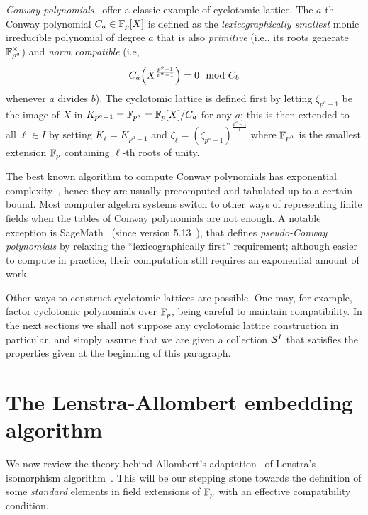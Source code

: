 \documentclass{sig-alternate}
\begin{document}
\emph{Conway polynomials}~\cite{Nickel1988} offer a classic example of
cyclotomic lattice. %
The $a$-th Conway polynomial $C_a\in\mathbb{F}_p[X]$ is defined as the
\emph{lexicographically smallest} monic irreducible polynomial of
degree $a$ that is also \emph{primitive} (i.e., its roots generate
$\mathbb{F}_{p^a}^\times$) and \emph{norm compatible} (i.e,
$$C_a\Bigl(X^{\frac{p^b-1}{p^a-1}}\Bigr) = 0 \mod C_b$$
whenever $a$ divides $b$). %
The cyclotomic lattice is defined first by letting $\zeta_{p^a-1}$ be the
image of $X$ in $K_{p^a-1}=\mathbb{F}_{p^a}=\mathbb{F}_p[X]/C_a$ for any $a$;
this is then extended to all $\ell\in I$ by setting $K_\ell=K_{p^a-1}$
and $\zeta_\ell=(\zeta_{p^a-1})^{\frac{p^a-1}{\ell}}$
where $\mathbb{F}_{p^a}$ is the smallest extension $\mathbb{F}_p$ containing $\ell$-th roots of unity.

The best known algorithm to compute Conway polynomials has exponential
complexity~\cite{heath+loehr99}, hence they are usually precomputed
and tabulated up to a certain bound. %
Most computer algebra systems switch to other ways of representing
finite fields when the tables of Conway polynomials are not enough. %
A notable exception is SageMath~\cite{Sage} (since version
5.13~\cite{Roe2013}), that defines \emph{pseudo-Conway polynomials} by
relaxing the ``lexicographically first'' requirement; although
easier to compute in practice, their computation still requires an
exponential amount of work.

Other ways to construct cyclotomic lattices are possible. %
One may, for example, factor cyclotomic polynomials over $\mathbb{F}_p$, being
careful to maintain compatibility. %
In the next sections we shall not suppose any cyclotomic lattice
construction in particular, and simply assume that we are given a
collection $\mathcal{S}^{I}$ that satisfies the properties given at the
beginning of this paragraph.

\section{The Lenstra-Allombert embedding algorithm}
\label{sec:lenstra}

We now review the theory behind Allombert's
adaptation~\cite{Allombert02} of Lenstra's isomorphism
algorithm~\cite{LenstraJr91}. %
This will be our stepping stone towards the definition of some
\emph{standard} elements in field extensions of $\mathbb{F}_p$ with an
effective compatibility condition.
\end{document}

